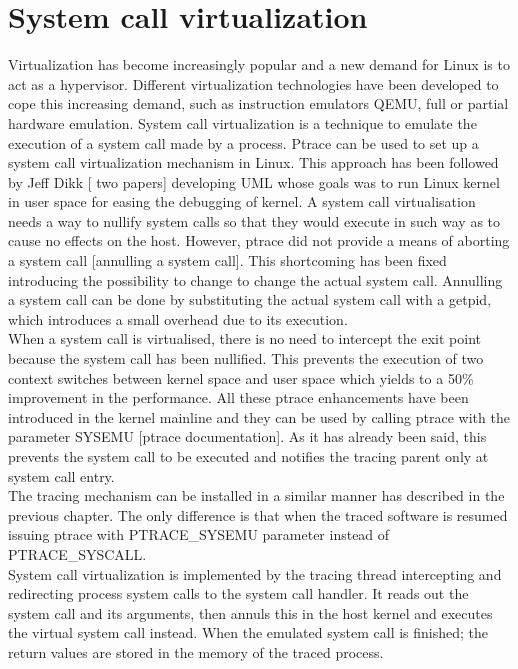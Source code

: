 \section{System call virtualization}
\label{system_call_virtualization}
Virtualization has become increasingly popular and a new demand for Linux is to act as a hypervisor. Different virtualization technologies have been developed to cope this increasing demand, such as instruction emulators QEMU, full or partial hardware emulation.  
System call virtualization is a technique to emulate the execution of a system call made by a process.
Ptrace can be used to set up a system call virtualization mechanism in Linux. This approach has been followed by Jeff Dikk [ two papers]  developing UML whose goals was to run Linux kernel in user space for easing the debugging of kernel.
A system call virtualisation needs a way to nullify system calls so that they would execute in such way as to cause no effects on the host.  However, ptrace did not provide a means of aborting a system call [annulling a system call].  This shortcoming has been fixed introducing the possibility to change to change the actual system call. Annulling a system call can be done by substituting the actual system call with a getpid, which introduces a small overhead due to its execution. \\
When a system call is virtualised, there is no need to intercept the exit point because the system call has been nullified.  This prevents the execution of two context switches between kernel space and user space which yields to a 50\% improvement in the performance.  All these ptrace enhancements have been introduced in the kernel mainline and they can be used by calling ptrace with the parameter SYSEMU [ptrace documentation]. As it has already been said, this prevents the system call to be executed and notifies the tracing parent only at system call entry.  \\
The tracing mechanism can be installed in a similar manner has described in the previous chapter. The only difference is that when the traced software is resumed issuing ptrace with PTRACE\_SYSEMU parameter instead of PTRACE\_SYSCALL.  \\
System call virtualization is implemented by the tracing thread intercepting and redirecting process system calls to the system call handler.  It reads out the system call and its arguments, then annuls this in the host kernel and executes the virtual system call instead. When the emulated system call is finished; the return values are stored in the memory of the traced process.
